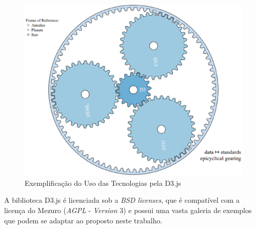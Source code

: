 \begin{figure}[!htb]
	\centering
    \includegraphics[keepaspectratio=true,scale=0.5]
    {figuras/d3_gears.eps}
  \caption{Exemplificação do Uso das Tecnologias pela D3.js}
  \label{fig:d3_gears}
\end{figure}

A biblioteca D3.js é licenciada sob a \textit{BSD licenses}, que é compatível
com a licença do Mezuro (\textit{AGPL} - \textit{Version} 3) e possui uma vasta
galeria de exemplos que podem se adaptar ao proposto neste trabalho.


